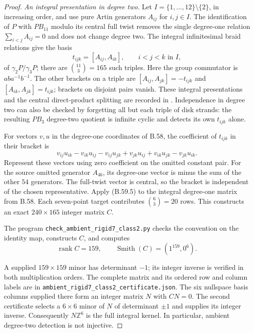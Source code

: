 \begin{proof}
\emph{An integral presentation in degree two.}
Let $I=\{1,\ldots,12\}\setminus\{2\}$, in increasing order,
and use pure Artin generators $A_{ij}$ for $i,j\in I$.
The identification of $P$ with $PB_{11}$ modulo its central
full twist removes the single degree-one relation
$\sum_{i<j}A_{ij}=0$ and does not change degree two.
The integral infinitesimal braid relations give the basis
\[
 t_{ijk}=[A_{ij},A_{ik}],\qquad i<j<k\text{ in }I,
                                                               \tag{B.59.4}
\]
of $\gamma_2P/\gamma_3P$; there are $\binom{11}{3}=165$
such triples.  Here the group commutator is $aba^{-1}b^{-1}$.
The other brackets on a triple are
$[A_{ij},A_{jk}]=-t_{ijk}$ and
$[A_{ik},A_{jk}]=t_{ijk}$; brackets on disjoint pairs vanish.
These integral presentations and the central direct-product
splitting are recorded in
\citet[Theorem 2.2(ii), equations (3.1)--(3.2), and
Theorem 3.1(ii)]{DE_KaabiVershinin2012}.
Independence in degree two can also be checked by forgetting
all but each triple of disk strands: the resulting $PB_3$
degree-two quotient is infinite cyclic and detects its own
$t_{ijk}$ alone.

For vectors $v,u$ in the degree-one coordinates of B.58,
the coefficient of $t_{ijk}$ in their bracket is
\[
 v_{ij}u_{ik}-v_{ik}u_{ij}
 -v_{ij}u_{jk}+v_{jk}u_{ij}
 +v_{ik}u_{jk}-v_{jk}u_{ik}.                              \tag{B.59.5}
\]
Represent these vectors using zero coefficient on the omitted
constant pair.  For the source omitted generator $A_{46}$,
its degree-one vector is minus the sum of the other $54$
generators.  The full-twist vector is central, so the bracket
is independent of the chosen representative.
Apply (B.59.5) to the integral degree-one matrix from B.58.
Each seven-point target contributes $\binom63=20$ rows.
This constructs an exact $240\times165$ integer matrix $C$.

The program \nolinkurl{check_ambient_rigid7_class2.py}
checks the convention on the identity map, constructs $C$,
and computes
\[
 \operatorname{rank}C=159,\qquad
 \operatorname{Smith}(C)=(1^{159},0^6).
                                                               \tag{B.59.6}
\]
\begin{sloppypar}
A supplied $159\times159$ minor has determinant $-1$;
its integer inverse is verified in both multiplication orders.
The complete matrix and its ordered row and column labels are in
\nolinkurl{ambient_rigid7_class2_certificate.json}.
The six nullspace basis columns supplied there form an
integer matrix $N$ with $CN=0$.
The second certificate selects a $6\times6$ minor of $N$
of determinant $\pm1$ and supplies its integer inverse.
Consequently $N\mathbb Z^6$ is the full integral kernel.
In particular, ambient degree-two detection is not injective.
\end{sloppypar}


\end{proof}

